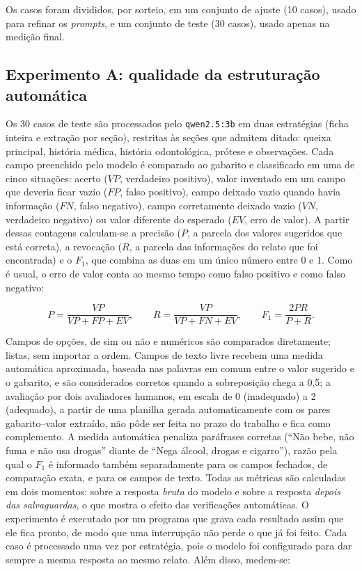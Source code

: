 Os casos foram divididos, por sorteio, em um conjunto de ajuste (10 casos), usado para refinar os \textit{prompts}, e um conjunto de teste (30 casos), usado apenas na medição final.

\subsection{Experimento A: qualidade da estruturação automática}
\label{sec:exp-ia}

Os 30 casos de teste são processados pelo \texttt{qwen2.5:3b} em duas estratégias (ficha inteira e extração por seção), restritas às seções que admitem ditado: queixa principal, história médica, história odontológica, prótese e observações. Cada campo preenchido pelo modelo é comparado ao gabarito e classificado em uma de cinco situações: acerto ($VP$, verdadeiro positivo), valor inventado em um campo que deveria ficar vazio ($FP$, falso positivo), campo deixado vazio quando havia informação ($FN$, falso negativo), campo corretamente deixado vazio ($VN$, verdadeiro negativo) ou valor diferente do esperado ($EV$, erro de valor). A partir dessas contagens calculam-se a precisão ($P$, a parcela dos valores sugeridos que está correta), a revocação ($R$, a parcela das informações do relato que foi encontrada) e o $F_1$, que combina as duas em um único número entre 0 e 1. Como é usual, o erro de valor conta ao mesmo tempo como falso positivo e como falso negativo:

\begin{equation}
	P = \frac{VP}{VP+FP+EV}, \qquad R = \frac{VP}{VP+FN+EV}, \qquad F_1 = \frac{2PR}{P+R}.
\end{equation}

Campos de opções, de sim ou não e numéricos são comparados diretamente; listas, sem importar a ordem. Campos de texto livre recebem uma medida automática aproximada, baseada nas palavras em comum entre o valor sugerido e o gabarito, e são considerados corretos quando a sobreposição chega a 0,5; a avaliação por dois avaliadores humanos, em escala de 0 (inadequado) a 2 (adequado), a partir de uma planilha gerada automaticamente com os pares gabarito--valor extraído, não pôde ser feita no prazo do trabalho e fica como complemento. A medida automática penaliza paráfrases corretas (``Não bebe, não fuma e não usa drogas'' diante de ``Nega álcool, drogas e cigarro''), razão pela qual o $F_1$ é informado também separadamente para os campos fechados, de comparação exata, e para os campos de texto. Todas as métricas são calculadas em dois momentos: sobre a resposta \emph{bruta} do modelo e sobre a resposta \emph{depois das salvaguardas}, o que mostra o efeito das verificações automáticas. O experimento é executado por um programa que grava cada resultado assim que ele fica pronto, de modo que uma interrupção não perde o que já foi feito. Cada caso é processado uma vez por estratégia, pois o modelo foi configurado para dar sempre a mesma resposta ao mesmo relato. Além disso, medem-se:

